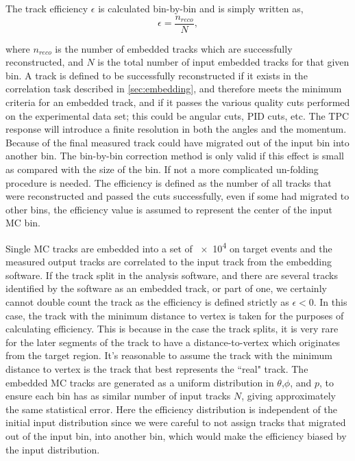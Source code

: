 The track efficiency $\epsilon$ is calculated bin-by-bin and is simply written as, 
\begin{equation}
\epsilon = \frac{n_{reco}}{N},
\end{equation}

where $n_{reco}$ is the number of embedded tracks which are successfully reconstructed, and $N$ is the total number of input embedded tracks for that given bin. A track is defined to be successfully reconstructed if it exists in the correlation task described in \ref{sec:embedding}, and therefore meets the minimum criteria for an embedded track, and if it passes the various quality cuts performed on the experimental data set; this could be angular cuts, PID cuts, etc. The TPC response will introduce a finite resolution in both the angles and the momentum. Because of the final measured track could have migrated out of the input bin into another bin. The bin-by-bin correction method is only valid if this effect is small as compared with the size of the bin. If not a more complicated un-folding procedure is needed. The efficiency is defined as the number of all tracks that were reconstructed and passed the cuts successfully, even if some had migrated to other bins, the efficiency value is assumed to represent the center of the input MC bin.  

 Single MC tracks are embedded into a set of \num{e4} on target events and the measured output tracks are correlated to the input track from the embedding software. If the track split in the analysis software, and there are several tracks identified by the software as an embedded track, or part of one, we certainly cannot double count the track as the efficiency is  defined strictly as $\epsilon < 0$. In this case, the track with the minimum distance to vertex is taken for the purposes of calculating efficiency. This is because in the case the track splits, it is very rare for the later segments of the track to have a distance-to-vertex which originates from the target region. It's reasonable to assume the track with the minimum distance to vertex is the track that best represents the ``real" track. The embedded MC tracks are generated as a uniform distribution in $\theta$,$\phi$, and $p$, to ensure each bin has as similar number of input tracks $N$, giving approximately the same statistical error. Here the efficiency distribution is independent of the initial input distribution since we were careful to not assign tracks that migrated out of the input bin, into another bin, which would make the efficiency biased by the input distribution. 
 
